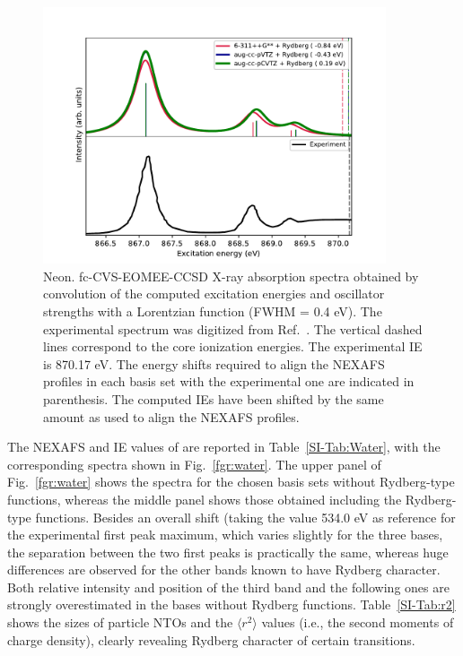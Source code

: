 \documentclass[journal=jctcce,manuscript=article]{achemso}
\begin{document}
\begin{figure}[H]
\includegraphics[width=0.9\textwidth]{Spectra/Ne_aCT.pdf}  
\caption{Neon. fc-CVS-EOMEE-CCSD X-ray absorption spectra obtained by convolution of the computed excitation energies and oscillator strengths with a Lorentzian function (FWHM = 0.4 eV). The experimental spectrum was digitized from Ref.~. 
The vertical dashed lines correspond to the core ionization energies. The experimental IE is 870.17 eV. 
The energy shifts 
required to align the NEXAFS profiles in each basis set with the
experimental one are indicated in parenthesis. The computed IEs have been shifted by the same amount as used to align the NEXAFS profiles.
\label{fgr:neon}
}
\end{figure}

The NEXAFS and IE values of  are reported in Table~\ref{SI-Tab:Water}, with the corresponding spectra shown in Fig.~\ref{fgr:water}. The upper panel of Fig.~\ref{fgr:water} shows the spectra for the chosen basis sets without Rydberg-type functions, whereas the middle panel shows those obtained including the Rydberg-type functions.
Besides an overall shift (taking the value 534.0 eV as reference for the experimental first peak maximum, which varies slightly for the three bases, the separation between the two first peaks is practically the same, whereas huge differences are observed for the other bands known to have Rydberg character.
Both relative intensity and position of the third band and the following ones are strongly overestimated in the bases without Rydberg functions. 
Table~\ref{SI-Tab:r2} shows the sizes of particle NTOs and the 
$\langle r^2 \rangle$ values (i.e., the second moments of charge density),
clearly revealing Rydberg character of certain transitions.
\end{document}
